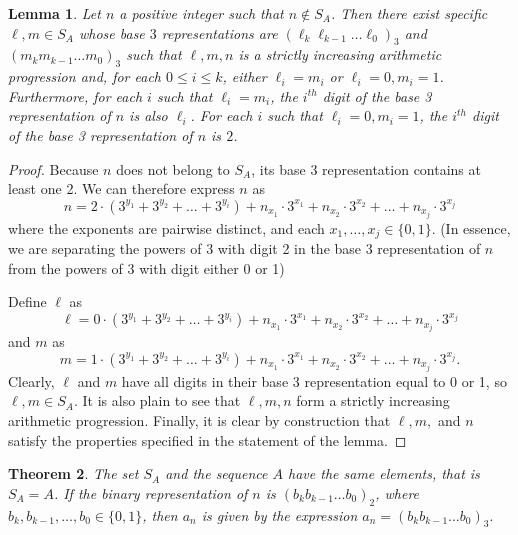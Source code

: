 \documentclass[11pt,letterpaper,twoside,english]{article}
\theoremstyle{theorem}
\newtheorem{theorem}{Theorem}
\newtheorem{lemma}[theorem]{Lemma}
\theoremstyle{remark}
\begin{document}
\begin{lemma} \label{lemma1}
Let $n$ a positive integer such that $n\not\in S_A$. Then there exist specific $\ell, m\in S_A$ whose base $3$ representations are $(\ell_k \ell_{k-1}\dots \ell_0)_3$ and $(m_km_{k-1}\ldots m_0)_3$ such that $\ell, m, n$ is a strictly increasing arithmetic progression and, for each $0\leq i \leq k$, either $\ell_i=m_i$ or $\ell_i=0, m_i=1$. Furthermore, for each $i$ such that $\ell_i=m_i$, the $i^{th}$ digit of the base 3 representation of $n$ is also $\ell_i$. For each $i$ such that $\ell_i=0, m_i=1$, the $i^{th}$ digit of the base 3 representation of $n$ is $2$.
\end{lemma}
\begin{proof}
Because $n$ does not belong to $S_A$, its base 3 representation contains at least one 2. We can therefore express $n$ as
\[n=2\cdot (3^{y_1}+3^{y_2}+\ldots + 3^{y_i})+n_{x_1}\cdot 3^{x_1}+n_{x_2}\cdot 3^{x_2}+\ldots+n_{x_j}\cdot 3^{x_j}\]
where the exponents are pairwise distinct, and each $x_1,\ldots, x_j\in \{0,1\}$. (In essence, we are separating the powers of 3 with digit 2 in the base 3 representation of $n$ from the powers of 3 with digit either 0 or 1)

Define $\ell$ as
\[\ell=0\cdot (3^{y_1}+3^{y_2}+\ldots + 3^{y_i})+n_{x_1}\cdot 3^{x_1}+n_{x_2}\cdot 3^{x_2}+\ldots+n_{x_j}\cdot 3^{x_j}\]
and $m$ as
\[m=1\cdot (3^{y_1}+3^{y_2}+\ldots + 3^{y_i})+n_{x_1}\cdot 3^{x_1}+n_{x_2}\cdot 3^{x_2}+\ldots+n_{x_j}\cdot 3^{x_j}.\]
Clearly, $\ell$ and $m$ have all digits in their base 3 representation equal to 0 or 1, so $\ell, m\in S_A$. It is also plain to see that $\ell, m, n$ form a strictly increasing arithmetic progression. Finally, it is clear by construction that $\ell,m,$ and $n$ satisfy the properties specified in the statement of the lemma.
\end{proof}

\begin{theorem} \label{thm:mainThmA}
The set $S_A$ and the sequence $A$ have the same elements, that is $S_A = A$. If the binary representation of $n$ is $(b_kb_{k-1}\ldots b_0)_2$, where $b_k, b_{k-1}, \ldots, b_0 \in \{0, 1\}$, then $a_n$ is given by the expression
$a_n = (b_k b_{k-1} \ldots b_0)_3.$

\end{theorem}
\end{document}
